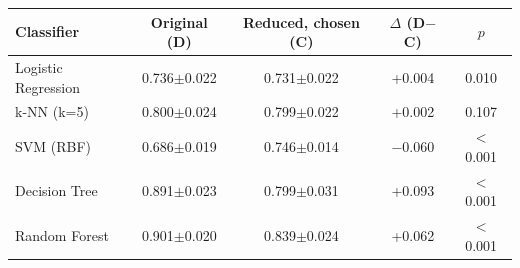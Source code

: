\begin{tabular}{lcccc}
\hline
Classifier & Original (D) & Reduced, chosen (C) & $\Delta$ (D$-$C) & $p$ \\
\hline
Logistic Regression & 0.736$\pm$0.022 & 0.731$\pm$0.022 & +0.004 & 0.010 \\
k-NN (k=5) & 0.800$\pm$0.024 & 0.799$\pm$0.022 & +0.002 & 0.107 \\
SVM (RBF) & 0.686$\pm$0.019 & 0.746$\pm$0.014 & $-$0.060 & $<$0.001 \\
Decision Tree & 0.891$\pm$0.023 & 0.799$\pm$0.031 & +0.093 & $<$0.001 \\
Random Forest & 0.901$\pm$0.020 & 0.839$\pm$0.024 & +0.062 & $<$0.001 \\
\hline
\end{tabular}
